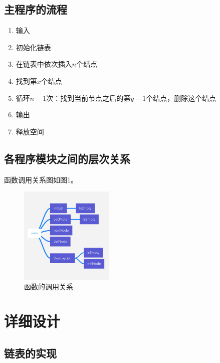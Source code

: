 \documentclass{article}
\begin{document}
\subsection{主程序的流程}

\begin{enumerate}
    \item 输入
    \item 初始化链表
    \item 在链表中依次插入$n$个结点
    \item 找到第$x$个结点
    \item 循环$n-1$次：找到当前节点之后的第$y-1$个结点，删除这个结点
    \item 输出
    \item 释放空间
\end{enumerate}

\subsection{各程序模块之间的层次关系}

函数调用关系图如图1。

\begin{figure}[htbp]
    
    \centering\includegraphics[width=0.4\textwidth]{./Images/pic1.PNG}
    
    \caption{函数的调用关系}
    
\end{figure}

\section{详细设计}

\subsection{链表的实现}
\end{document}
